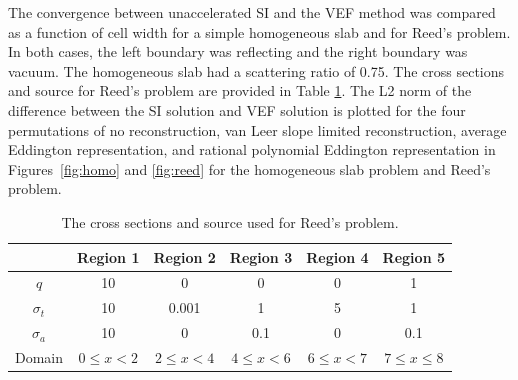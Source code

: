 The convergence between unaccelerated SI and the VEF method was compared as a function of cell width for a simple homogeneous slab and for Reed's problem. In both cases, the left boundary was reflecting and the right boundary was vacuum. The homogeneous slab had a scattering ratio of 0.75. The cross sections and source for Reed's problem are provided in Table \ref{tab:reedXS}. The L2 norm of the difference between the SI solution and VEF solution is plotted for the four permutations of no reconstruction, van Leer slope limited reconstruction, average Eddington representation, and rational polynomial Eddington representation in Figures~\ref{fig:homo} and \ref{fig:reed} for the homogeneous slab problem and Reed's problem. 

	\begin{table} \centering
		\begin{tabular}{|c|c|c|c|c|c|}
			\hline
			& Region 1 & Region 2 & Region 3 & Region 4 & Region 5 \\ 
			\hline 
			$q$ & 10 & 0 & 0 & 0 & 1 \\ 
			$\sigma_t$ & 10 & 0.001 & 1 & 5 & 1 \\ 
			$\sigma_a$ & 10 & 0 & 0.1 & 0 & 0.1 \\ 
			\hline 
			Domain & $0 \leq x < 2$ & $2 \leq x < 4$ & $4\leq x < 6$ &
				$6 \leq x < 7$ & $7 \leq x \leq 8$\\ 
			\hline 
		\end{tabular}
		\caption{The cross sections and source used for Reed's problem.}
		\label{tab:reedXS}
	\end{table}

